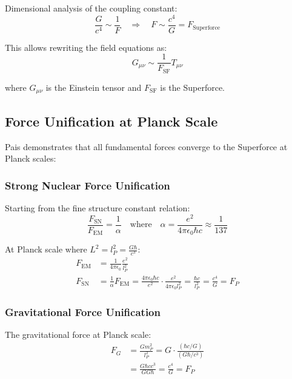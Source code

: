 Dimensional analysis of the coupling constant:
\begin{equation}
\frac{G}{c^4} \sim \frac{1}{F} \quad \Rightarrow \quad F \sim \frac{c^4}{G} = F_{\text{Superforce}}
\end{equation}

This allows rewriting the field equations as:
\begin{equation}
G_{\mu\nu} \sim \frac{1}{F_{\text{SF}}} T_{\mu\nu}
\end{equation}

where $G_{\mu\nu}$ is the Einstein tensor and $F_{\text{SF}}$ is the Superforce.

\subsection{Force Unification at Planck Scale}

Pais demonstrates that all fundamental forces converge to the Superforce at Planck scales:

\subsubsection{Strong Nuclear Force Unification}

Starting from the fine structure constant relation:
\begin{equation}
\frac{F_{\text{SN}}}{F_{\text{EM}}} = \frac{1}{\alpha} \quad \text{where} \quad \alpha = \frac{e^2}{4\pi\epsilon_0 \hbar c} \approx \frac{1}{137}
\end{equation}

At Planck scale where $L^2 = l_P^2 = \frac{G\hbar}{c^3}$:
\begin{align}
F_{\text{EM}} &= \frac{1}{4\pi\epsilon_0} \frac{e^2}{l_P^2} \\
F_{\text{SN}} &= \frac{1}{\alpha} F_{\text{EM}} = \frac{4\pi\epsilon_0\hbar c}{e^2} \cdot \frac{e^2}{4\pi\epsilon_0 l_P^2} = \frac{\hbar c}{l_P^2} = \frac{c^4}{G} = F_P
\end{align}

\subsubsection{Gravitational Force Unification}

The gravitational force at Planck scale:
\begin{align}
F_G &= \frac{G m_P^2}{l_P^2} = G \cdot \frac{(\hbar c/G)}{(G\hbar/c^3)} \\
&= \frac{G \hbar c c^3}{G G \hbar} = \frac{c^4}{G} = F_P
\end{align}

